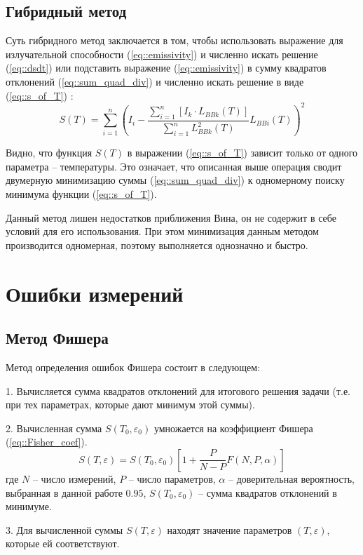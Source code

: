 \subsection{Гибридный метод}

Суть гибридного метод заключается в том, чтобы использовать выражение для излучательной способности (\ref{eq::emissivity}) и численно искать решение (\ref{eq::dsdt}) или подставить выражение (\ref{eq::emissivity}) в сумму квадратов отклонений (\ref{eq::sum_quad_div}) и численно искать решение в виде (\ref{eq::s_of_T}) \cite{2}:
\begin{equation}
\label{eq::s_of_T}
    S(T) = \sum\limits_{i=1}^n (I_i - \dfrac{\sum_{i=1}^n [I_k \cdot L_{BBk}(T)]}{\sum_{i=1}^n L_{BBk}^2 (T)} L_{BBi}(T))^2
\end{equation}

Видно, что функция $S(T)$ в выражении (\ref{eq::s_of_T}) зависит только от одного параметра – температуры. Это означает, что описанная выше операция сводит двумерную минимизацию суммы (\ref{eq::sum_quad_div}) к одномерному поиску минимума функции (\ref{eq::s_of_T}).

Данный метод лишен недостатков приближения Вина, он не содержит в себе условий для его использования. При этом минимизация данным методом производится одномерная, поэтому выполняется однозначно и быстро.

\section{Ошибки измерений}
\subsection{Метод Фишера}
Метод определения ошибок Фишера состоит в следующем:

1. Вычисляется сумма квадратов отклонений для итогового решения задачи (т.е. при тех параметрах, которые дают минимум этой суммы).

2. Вычисленная сумма $S (T_0,\varepsilon_0)$ умножается на коэффициент Фишера (\ref{eq::Fisher_coef}).
\begin{equation}
\label{eq::Fisher_coef}
    S(T, \varepsilon) = S(T_0, \varepsilon_0) [1 + \dfrac{P}{N - P} F(N,P,\alpha)]
\end{equation}
где $N$ – число измерений, $P$ – число параметров, $\alpha$ – доверительная вероятность, выбранная в данной работе $0.95$, $S (T_0,\varepsilon_0)$ – сумма квадратов отклонений в минимуме.

3. Для вычисленной суммы $S (T,\varepsilon)$ находят значение параметров $(T,\varepsilon)$, которые ей соответствуют.

